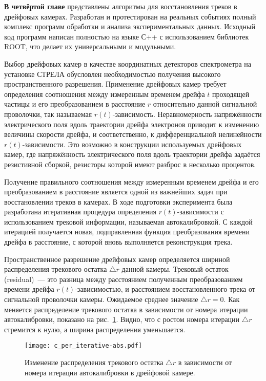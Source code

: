 \vspace{1ex}
\textbf{В четвёртой главе} представлены алгоритмы для восстановления треков в
дрейфовых камерах. Разработан и протестирован на реальных событиях полный
комплекс программ обработки и анализа экспериментальных данных. Исходный код
программ написан полностью на языке С++ с использованием библиотек ROOT, что
делает их универсальными и модульными.

Выбор дрейфовых камер в качестве координатных детекторов спектрометра на
установке СТРЕЛА обусловлен необходимостью получения высокого пространственного
разрешения. Применение дрейфовых камер требует определения соотношения между
измеренным временем дрейфа $t$ проходящей частицы и его преобразованием в
расстояние $r$ относительно данной сигнальной проволочки, так называемая
$r(t)$-зависимость. Неравномерность напряжённости электрического поля вдоль
траектории дрейфа электронов приводит к изменению величины скорости дрейфа, и
соответственно, к дифференциальной нелинейности $r(t)$-зависимости. Это возможно
в конструкции используемых дрейфовых камер, где напряжённость электрического
поля вдоль траектории дрейфа задаётся резистивной сборкой, резисторы которой
имеют разброс в несколько процентов.

Получение правильного соотношения между измеренным временем дрейфа и его
преобразованием в расстояние является одной из важнейших задач при
восстановлении треков в камерах. В ходе подготовки эксперимента была разработана
итеративная процедура определения $r(t)$-зависимости с использованием трековой
информации, называемая автокалибровкой. С каждой итерацией получается новая,
подправленная функция преобразования времени дрейфа в расстояние, с которой
вновь выполняется реконструкция трека.

Пространственное разрешение дрейфовых камер определяется шириной распределения
трекового остатка $\triangle r$ данной камеры. Трековый остаток (residual)~---
это разница между расстоянием полученным преобразованием времени дрейфа
$r(t)$-зависимостью, и расстоянием восстановленного трека от сигнальной
проволочки камеры. Ожидаемое среднее значение $\triangle r = 0$. Как меняется
распределение трекового остатка в зависимости от номера итерации автокалибровки,
показано на рис.~\ref{fig:per_iterative}. Видно, что с ростом номера итерации
$\triangle r$ стремится к нулю, а ширина распределения уменьшается.

\begin{figure}[h]
  \centering
  \texttt{[image: c\_per\_iterative-abs.pdf]}
  \caption{Изменение распределения трекового остатка $\triangle r$ в зависимости
    от номера итерации автокалибровки в дрейфовой камере.}
  \label{fig:per_iterative}
\end{figure}

